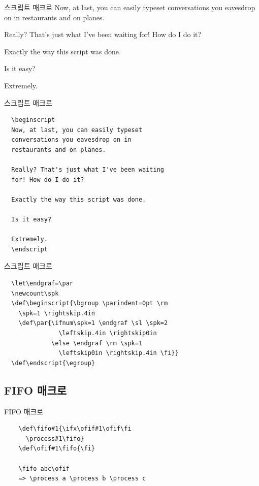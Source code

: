 \documentclass{beamer}
\begin{document}
\begin{frame}[fragile]{스크립트 매크로}
  \hsize 3in
  \beginscript
  Now, at last, you can easily typeset
  conversations you eavesdrop on in
  restaurants and on planes.
  
  Really? That's just what I've been waiting
  for! How do I do it?
  
  Exactly the way this script was done.
  
  Is it easy?
  
  Extremely.
  \endscript
\end{frame}


%
\begin{frame}[fragile]{스크립트 매크로}
  \begin{verbatim}
  \beginscript
  Now, at last, you can easily typeset
  conversations you eavesdrop on in
  restaurants and on planes.
  
  Really? That's just what I've been waiting
  for! How do I do it?
  
  Exactly the way this script was done.
  
  Is it easy?
  
  Extremely.
  \endscript
  \end{verbatim}
\end{frame}


%
\begin{frame}[fragile]{스크립트 매크로}
  \begin{verbatim}
  \let\endgraf=\par
  \newcount\spk
  \def\beginscript{\bgroup \parindent=0pt \rm
    \spk=1 \rightskip.4in
    \def\par{\ifnum\spk=1 \endgraf \sl \spk=2
               \leftskip.4in \rightskip0in
             \else \endgraf \rm \spk=1
               \leftskip0in \rightskip.4in \fi}}
  \def\endscript{\egroup}
  \end{verbatim}
\end{frame}


\subsection{FIFO 매크로}

%
\begin{frame}[fragile]{FIFO 매크로}
  \begin{verbatim}
    \def\fifo#1{\ifx\ofif#1\ofif\fi
      \process#1\fifo}
    \def\ofif#1\fifo{\fi}

    \fifo abc\ofif
    => \process a \process b \process c
  \end{verbatim}
\end{frame}
\end{document}
